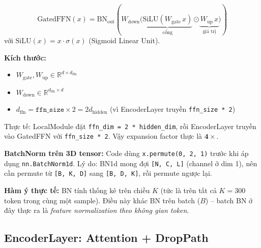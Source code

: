 \documentclass[12pt,a4paper]{article}
\begin{document}
\begin{mathbox}[title={Công thức SwiGLU FFN}]
\begin{equation}
  \text{GatedFFN}(x) = \text{BN}_\text{out}\!\left(
    W_\text{down} \bigl(
      \underbrace{\text{SiLU}(W_\text{gate}\, x)}_{\text{cổng}} \odot
      \underbrace{W_\text{up}\, x}_{\text{giá trị}}
    \bigr)
  \right)
  \label{eq:swiglu}
\end{equation}
với $\text{SiLU}(x) = x \cdot \sigma(x)$ (Sigmoid Linear Unit).

\textbf{Kích thước:}
\begin{itemize}[nosep]
  \item $W_\text{gate}, W_\text{up} \in \mathbb{R}^{d \times d_\text{ffn}}$
  \item $W_\text{down} \in \mathbb{R}^{d_\text{ffn} \times d}$
  \item $d_\text{ffn} = \texttt{ffn\_size} \times 2 = 2d_\text{hidden}$
        (vì EncoderLayer truyền \texttt{ffn\_size * 2})
\end{itemize}
Thực tế: LocalModule đặt \texttt{ffn\_dim = 2 * hidden\_dim}, rồi
EncoderLayer truyền vào GatedFFN với \texttt{ffn\_size * 2}.
Vậy expansion factor thực là $\mathbf{4\times}$.
\end{mathbox}

\begin{insightbox}
\textbf{BatchNorm trên 3D tensor:} Code dùng \texttt{x.permute(0, 2, 1)}
trước khi áp dụng \texttt{nn.BatchNorm1d}. Lý do: BN1d mong đợi
\texttt{[N, C, L]} (channel ở dim 1), nên cần permute từ \texttt{[B, K, D]}
sang \texttt{[B, D, K]}, rồi permute ngược lại.

\textbf{Hàm ý thực tế:} BN tính thống kê trên chiều $K$ (tức là trên tất cả
$K=300$ token trong cùng một sample). Điều này khác BN trên batch ($B$) --
batch BN ở đây thực ra là \emph{feature normalization theo không gian token}.
\end{insightbox}

\subsection{EncoderLayer: Attention + DropPath}
\end{document}
